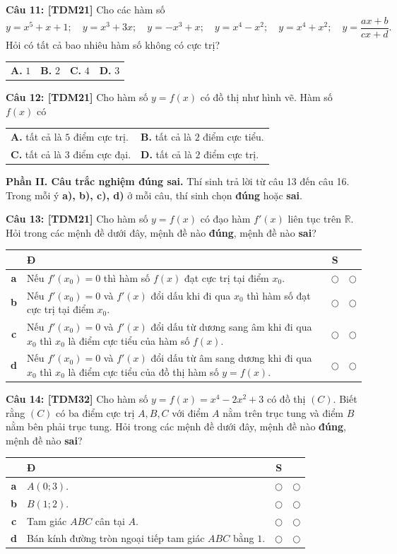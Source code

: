 \documentclass[12pt,a4paper]{article}
\makeatletter
\newcommand{\question}[2][TDM21]{%
  \par\addvspace{5pt}\noindent
  \textbf{\textcolor{sectionpurple}{Câu #2:} \textcolor{noteborder}{[#1]}}\enspace
}
\newcommand{\answerlabel}[1]{\textbf{\textcolor{sectionpurple}{#1.}}}
\newcommand{\fourchoices}[4]{%
  \par\nobreak\smallskip
  \begin{tabular*}{\linewidth}{@{}l@{\extracolsep{\fill}}lll@{}}
    \answerlabel{A} #1 & \answerlabel{B} #2 & \answerlabel{C} #3 & \answerlabel{D} #4
  \end{tabular*}\par
}
\newcommand{\twochoices}[4]{%
  \par\nobreak\smallskip
  \begin{tabularx}{\linewidth}{@{}>{\raggedright\arraybackslash}X>{\raggedright\arraybackslash}X@{}}
    \answerlabel{A} #1 & \answerlabel{B} #2 \\[2pt]
    \answerlabel{C} #3 & \answerlabel{D} #4
  \end{tabularx}\par
}
\newcommand{\tfbox}[4]{%
\begin{notebox}
\renewcommand{\arraystretch}{1.45}
\setlength{\tabcolsep}{5pt}
\begin{tabularx}{\linewidth}{|>{\bfseries\color{sectionpurple}}c|>{\raggedright\arraybackslash}X|c|c|}
\hline
\multicolumn{2}{|c|}{\textbf{\textcolor{sectionpurple}{Mệnh đề}}}
& \textbf{\textcolor{sectionpurple}{Đ}} & \textbf{\textcolor{sectionpurple}{S}} \\
\hline
a & #1 & $\bigcirc$ & $\bigcirc$ \\[2pt]\hline
b & #2 & $\bigcirc$ & $\bigcirc$ \\[2pt]\hline
c & #3 & $\bigcirc$ & $\bigcirc$ \\[2pt]\hline
d & #4 & $\bigcirc$ & $\bigcirc$ \\[2pt]\hline
\end{tabularx}
\end{notebox}
}
\makeatother
\begin{document}
\question{11} Cho các hàm số
\[
y=x^5+x+1;\quad y=x^3+3x;\quad y=-x^3+x;\quad
y=x^4-x^2;\quad y=x^4+x^2;\quad y=\frac{ax+b}{cx+d}.
\]
Hỏi có tất cả bao nhiêu hàm số không có cực trị?
\fourchoices{$1$}{$2$}{$4$}{$3$}

\question{12} Cho hàm số $y=f(x)$ có đồ thị như hình vẽ. Hàm số $f(x)$ có
\begin{notebox}
\centering
{}
\end{notebox}
\twochoices{tất cả là $5$ điểm cực trị.}{tất cả là $2$ điểm cực tiểu.}
{tất cả là $3$ điểm cực đại.}{tất cả là $2$ điểm cực trị.}

\par\addvspace{7pt}
\textbf{Phần II. Câu trắc nghiệm đúng sai.}
Thí sinh trả lời từ câu 13 đến câu 16. Trong mỗi ý \textbf{a), b), c), d)} ở mỗi câu,
thí sinh chọn \textbf{đúng} hoặc \textbf{sai}.

\question[TDM21]{13} Cho hàm số $y=f(x)$ có đạo hàm $f'(x)$ liên tục trên $\mathbb{R}$.
Hỏi trong các mệnh đề dưới đây, mệnh đề nào \textbf{đúng}, mệnh đề nào \textbf{sai}?
\tfbox
{Nếu $f'(x_0)=0$ thì hàm số $f(x)$ đạt cực trị tại điểm $x_0$.}
{Nếu $f'(x_0)=0$ và $f'(x)$ đổi dấu khi đi qua $x_0$ thì hàm số đạt cực trị tại điểm $x_0$.}
{Nếu $f'(x_0)=0$ và $f'(x)$ đổi dấu từ dương sang âm khi đi qua $x_0$ thì $x_0$ là điểm cực tiểu của hàm số $f(x)$.}
{Nếu $f'(x_0)=0$ và $f'(x)$ đổi dấu từ âm sang dương khi đi qua $x_0$ thì $x_0$ là điểm cực tiểu của đồ thị hàm số $y=f(x)$.}

\question[TDM32]{14} Cho hàm số $y=f(x)=x^4-2x^2+3$ có đồ thị $(C)$.
Biết rằng $(C)$ có ba điểm cực trị $A,B,C$ với điểm $A$ nằm trên trục tung và điểm $B$ nằm bên phải trục tung.
Hỏi trong các mệnh đề dưới đây, mệnh đề nào \textbf{đúng}, mệnh đề nào \textbf{sai}?
\tfbox
{$A(0;3)$.}
{$B(1;2)$.}
{Tam giác $ABC$ cân tại $A$.}
{Bán kính đường tròn ngoại tiếp tam giác $ABC$ bằng $1$.}
\end{document}
